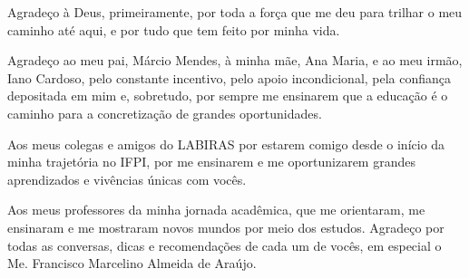 Agradeço à Deus, primeiramente, por toda a força que me deu para trilhar o meu caminho até aqui, e por tudo que tem feito por minha vida.

Agradeço ao meu pai, Márcio Mendes, à minha mãe, Ana Maria, e ao meu irmão, Iano Cardoso, pelo constante incentivo, pelo apoio incondicional, pela confiança depositada em mim e, sobretudo, por sempre me ensinarem que a educação é o caminho para a concretização de grandes oportunidades.

Aos meus colegas e amigos do LABIRAS por estarem comigo desde o início da minha trajetória no IFPI, por me ensinarem e me oportunizarem grandes aprendizados e vivências únicas com vocês.

Aos meus professores da minha jornada acadêmica, que me orientaram, me ensinaram e me mostraram novos mundos por meio dos estudos. Agradeço por todas as conversas, dicas e recomendações de cada um de vocês, em especial o Me. Francisco Marcelino Almeida de Araújo.